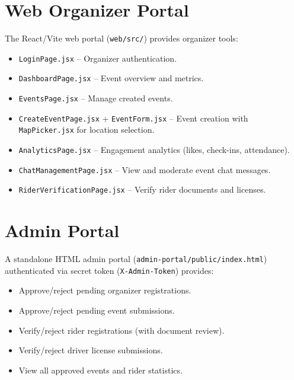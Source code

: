 \section{Web Organizer Portal}
The React/Vite web portal (\texttt{web/src/}) provides organizer tools:
\begin{itemize}[noitemsep]
    \item \texttt{LoginPage.jsx} -- Organizer authentication.
    \item \texttt{DashboardPage.jsx} -- Event overview and metrics.
    \item \texttt{EventsPage.jsx} -- Manage created events.
    \item \texttt{CreateEventPage.jsx} + \texttt{EventForm.jsx} -- Event creation with \texttt{MapPicker.jsx} for location selection.
    \item \texttt{AnalyticsPage.jsx} -- Engagement analytics (likes, check-ins, attendance).
    \item \texttt{ChatManagementPage.jsx} -- View and moderate event chat messages.
    \item \texttt{RiderVerificationPage.jsx} -- Verify rider documents and licenses.
\end{itemize}

\section{Admin Portal}
A standalone HTML admin portal (\texttt{admin-portal/public/index.html}) authenticated via secret token (\texttt{X-Admin-Token}) provides:
\begin{itemize}[noitemsep]
    \item Approve/reject pending organizer registrations.
    \item Approve/reject pending event submissions.
    \item Verify/reject rider registrations (with document review).
    \item Verify/reject driver license submissions.
    \item View all approved events and rider statistics.
\end{itemize}